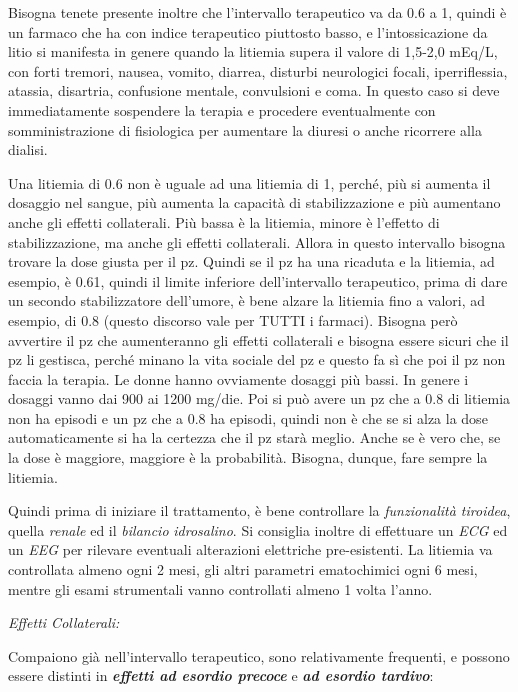 \documentclass[]{article}
\begin{document}
Bisogna tenete presente inoltre che l'intervallo terapeutico va da 0.6 a
1, quindi è un farmaco che ha con indice terapeutico piuttosto basso, e
l'intossicazione da litio si manifesta in genere quando la litiemia
supera il valore di 1,5-2,0 mEq/L, con forti tremori, nausea, vomito,
diarrea, disturbi neurologici focali, iperriflessia, atassia, disartria,
confusione mentale, convulsioni e coma. In questo caso si deve
immediatamente sospendere la terapia e procedere eventualmente con
somministrazione di fisiologica per aumentare la diuresi o anche
ricorrere alla dialisi.

Una litiemia di 0.6 non è uguale ad una litiemia di 1, perché, più si
aumenta il dosaggio nel sangue, più aumenta la capacità di
stabilizzazione e più aumentano anche gli effetti collaterali. Più bassa
è la litiemia, minore è l'effetto di stabilizzazione, ma anche gli
effetti collaterali. Allora in questo intervallo bisogna trovare la dose
giusta per il pz. Quindi se il pz ha una ricaduta e la litiemia, ad
esempio, è 0.61, quindi il limite inferiore dell'intervallo terapeutico,
prima di dare un secondo stabilizzatore dell'umore, è bene alzare la
litiemia fino a valori, ad esempio, di 0.8 (questo discorso vale per
TUTTI i farmaci). Bisogna però avvertire il pz che aumenteranno gli
effetti collaterali e bisogna essere sicuri che il pz li gestisca,
perché minano la vita sociale del pz e questo fa sì che poi il pz non
faccia la terapia. Le donne hanno ovviamente dosaggi più bassi. In
genere i dosaggi vanno dai 900 ai 1200 mg/die. Poi si può avere un pz
che a 0.8 di litiemia non ha episodi e un pz che a 0.8 ha episodi,
quindi non è che se si alza la dose automaticamente si ha la certezza
che il pz starà meglio. Anche se è vero che, se la dose è maggiore,
maggiore è la probabilità. Bisogna, dunque, fare sempre la litiemia.

Quindi prima di iniziare il trattamento, è bene controllare la
\emph{funzionalità tiroidea}, quella \emph{renale} ed il \emph{bilancio}
\emph{idrosalino}. Si consiglia inoltre di effettuare un \emph{ECG} ed
un \emph{EEG} per rilevare eventuali alterazioni elettriche
pre-esistenti. La litiemia va controllata almeno ogni 2 mesi, gli altri
parametri ematochimici ogni 6 mesi, mentre gli esami strumentali vanno
controllati almeno 1 volta l'anno.

\emph{\emph{Effetti Collaterali:}}

Compaiono già nell'intervallo terapeutico, sono relativamente frequenti,
e possono essere distinti in \textbf{\emph{effetti ad esordio precoce}}
e \textbf{\emph{ad esordio tardivo}}:
\end{document}
